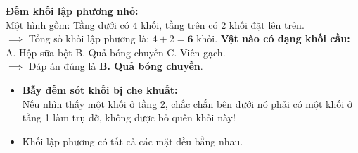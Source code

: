 \documentclass[11pt,a4paper]{article}
\begin{document}
\vspace{-1.5mm}
\noindent
\begin{minipage}[t]{0.49\textwidth}\vspace{0pt}
\begin{tcolorbox}[
  enhanced,
  colback=green!4!white,
  colframe=green!60!black,
  arc=2mm, boxrule=0.8pt,
  left=2mm, right=2mm, top=1.8mm, bottom=1.8mm,
  title={\footnotesize\bfseries\color{white}\faCheckCircle\ 4. Ví dụ thực hành chuẩn mực}
]
{\footnotesize
\textbf{Đếm khối lập phương nhỏ:}\\
Một hình gồm: Tầng dưới có $4$ khối, tầng trên có $2$ khối đặt lên trên.\\
$\implies$ Tổng số khối lập phương là: $4 + 2 = \mathbf{6}$ khối.
\textbf{Vật nào có dạng khối cầu:}\\
A. Hộp sữa bột \quad B. Quả bóng chuyền \quad C. Viên gạch.\\
$\implies$ Đáp án đúng là \textbf{B. Quả bóng chuyền}.
}
\end{tcolorbox}
\end{minipage}
\hfill
\begin{minipage}[t]{0.49\textwidth}\vspace{0pt}
\begin{tcolorbox}[
  enhanced,
  colback=red!4!white,
  colframe=red!75!black,
  arc=2mm, boxrule=0.8pt,
  left=2mm, right=2mm, top=1.8mm, bottom=1.8mm,
  title={\footnotesize\bfseries\color{white}\faExclamationTriangle\ 5. Mẹo tránh bẫy trắc nghiệm}
]
{\footnotesize
\begin{itemize}\setlength{\itemsep}{1pt}\setlength{\leftskip}{-2.5mm}
  \item \textbf{Bẫy đếm sót khối bị che khuất:}\\
  Nếu nhìn thấy một khối ở tầng 2, chắc chắn bên dưới nó phải có một khối ở tầng 1 làm trụ đỡ, không được bỏ quên khối này!
  \item Khối lập phương có tất cả các mặt đều bằng nhau.
\end{itemize}
}
\end{tcolorbox}
\end{minipage}
\end{document}
